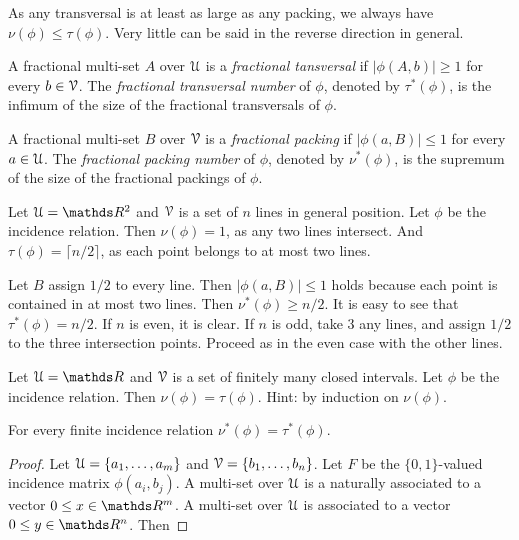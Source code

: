 \documentclass[sputnik.tex]{subfiles}
\begin{document}
As any transversal is at least as large as any packing, we always have $\nu(\phi)\le\tau(\phi)$.
Very little can be said in the reverse direction in general.

A fractional multi-set $A$ over $\EuScript U$ is a \emph{fractional tansversal\/} if $|\phi(A, b)|\ge1$ for every $b\in\EuScript V$.
The \emph{fractional transversal number\/} of $\phi$, denoted by $\tau^*(\phi)$, is the  infimum of the size of the fractional transversals of $\phi$.

A fractional multi-set $B$ over $\EuScript V$ is a \emph{fractional packing\/} if $|\phi(a,B)|\le1$ for every $a\in\EuScript U$.
The \emph{fractional packing number\/} of $\phi$, denoted by $\nu^*(\phi)$, is the supremum of the size of the fractional packings of $\phi$.

\begin{example}
Let $\U=\RR^2$ and $\EuScript V$ is a set of $n$ lines in general position.
Let $\phi$ be the incidence relation.
Then $\nu(\phi)=1$, as any two lines intersect.
And $\tau(\phi)=\lceil n/2\rceil$, as each point belongs to at most two lines.

Let $B$ assign $1/2$ to every line. Then $|\phi(a,B)|\le1$ holds because each point is contained in at most two lines.
Then $\nu^*(\phi)\ge n/2$.
It is easy to see that $\tau^*(\phi)= n/2$.
If $n$ is even, it is clear.
If $n$ is odd, take $3$ any lines, and assign $1/2$ to the three intersection points.
Proceed as in the even case with the other lines.\QED
\end{example}

\begin{exercise}
Let $\U=\RR$ and $\EuScript V$ is a set of finitely many closed intervals.
Let $\phi$ be the incidence relation.
Then $\nu(\phi)=\tau(\phi)$.
Hint: by induction on $\nu(\phi)$.
\end{exercise}

\begin{theorem}
For every finite incidence relation $\nu^*(\phi)=\tau^*(\phi)$.
\end{theorem}
\begin{proof}
Let $\EuScript U=\{a_1,\dots,a_m\}$ and $\EuScript V=\{b_1,\dots,b_n\}$.
Let $F$ be the $\{0,1\}$-valued incidence matrix $\phi(a_i,b_j)$.
A multi-set over $\EuScript U$ is a naturally associated to a vector $0\le x\in\RR^m$.
A multi-set over $\EuScript U$ is associated to a vector $0\le y\in\RR^n$. 
Then 






\end{proof}
\end{document}
